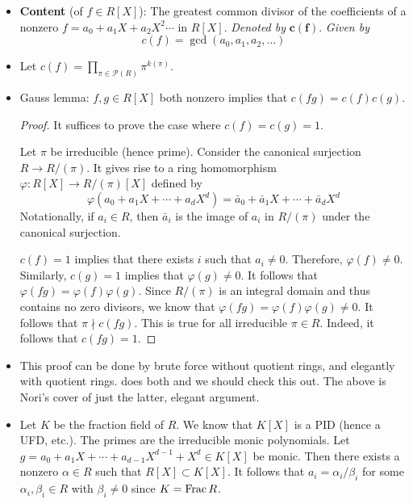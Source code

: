 \documentclass[../notes.tex]{subfiles}
\begin{document}
\begin{itemize}
\begin{proof}
    \end{proof}
    \item \textbf{Content} (of $f\in R[X]$): The greatest common divisor of the coefficients of a nonzero $f=a_0+a_1X+a_2X^2\cdots$ in $R[X]$. \emph{Denoted by} $\bm{c(f)}$. \emph{Given by}
    \begin{equation*}
        c(f) = \gcd(a_0,a_1,a_2,\dots)
    \end{equation*}
    \item Let $c(f)=\prod_{\pi\in\mathcal{P}(R)}\pi^{k(\pi)}$.
    \item Gauss lemma: $f,g\in R[X]$ both nonzero implies that $c(fg)=c(f)c(g)$.
    \begin{proof}
        It suffices to prove the case where $c(f)=c(g)=1$.\par
        Let $\pi$ be irreducible (hence prime). Consider the canonical surjection $R\to R/(\pi)$. It gives rise to a ring homomorphism $\varphi:R[X]\to R/(\pi)[X]$ defined by
        \begin{equation*}
            \varphi(a_0+a_1X+\cdots+a_dX^d) = \bar{a}_0+\bar{a}_1X+\cdots+\bar{a}_dX^d
        \end{equation*}
        Notationally, if $a_i\in R$, then $\bar{a}_i$ is the image of $a_i$ in $R/(\pi)$ under the canonical surjection.\par
        $c(f)=1$ implies that there exists $i$ such that $a_i\neq 0$. Therefore, $\varphi(f)\neq 0$. Similarly, $c(g)=1$ implies that $\varphi(g)\neq 0$. It follows that $\varphi(fg)=\varphi(f)\varphi(g)$. Since $R/(\pi)$ is an integral domain and thus contains no zero divisors, we know that $\varphi(fg)=\varphi(f)\varphi(g)\neq 0$. It follows that $\pi\nmid c(fg)$. This is true for all irreducible $\pi\in R$. Indeed, it follows that $c(fg)=1$.
    \end{proof}
    \item This proof can be done by brute force without quotient rings, and elegantly with quotient rings. \textcite{bib:DummitFoote} does both and we should check this out. The above is Nori's cover of just the latter, elegant argument.
    \item Let $K$ be the fraction field of $R$. We know that $K[X]$ is a PID (hence a UFD, etc.). The primes are the irreducible monic polynomials. Let $g=a_0+a_1X+\cdots+a_{d-1}X^{d-1}+X^d\in K[X]$ be monic. Then there exists a nonzero $\alpha\in R$ such that $R[X]\subset K[X]$. It follows that $a_i=\alpha_i/\beta_i$ for some $\alpha_i,\beta_i\in R$ with $\beta_i\neq 0$ since $K=\operatorname{Frac} R$.

\end{itemize}
\end{document}
